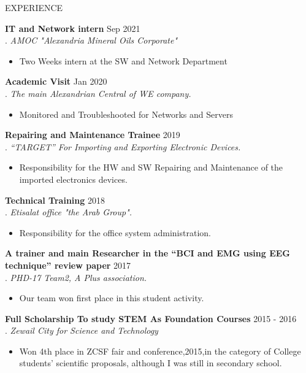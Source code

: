 \documentclass{resume} %
\begin{document}
\begin{rSection}{EXPERIENCE}
 
  \textbf{IT and Network intern} \hfill   Sep 2021\\
 . \hfill \textit{AMOC "Alexandria Mineral Oils Corporate"}
  \begin{itemize}
     \itemsep -3pt {} 
      \item Two Weeks intern at the SW and Network Department
 \end{itemize}
 
   \textbf{Academic Visit} \hfill   Jan 2020\\
. \hfill \textit{The main Alexandrian Central of WE company.}
  \begin{itemize}
     \itemsep -3pt {} 
      \item  Monitored and Troubleshooted for Networks and Servers
 \end{itemize}
 
    \textbf{Repairing and Maintenance Trainee} \hfill    2019\\
. \hfill \textit{“TARGET” For Importing and Exporting Electronic Devices.}
  \begin{itemize}
     \itemsep -3pt {} 
      \item  Responsibility for the HW and SW Repairing and Maintenance of the imported electronics devices.
 \end{itemize}
 
     \textbf{Technical Training} \hfill   2018\\
. \hfill \textit{Etisalat office "the Arab Group".}
  \begin{itemize}
     \itemsep -3pt {} 
      \item  Responsibility for the office system administration.
 \end{itemize}

     \textbf{A trainer and main Researcher in the “BCI and EMG using EEG technique” review paper} \hfill   2017\\
. \hfill \textit{PHD-17 Team2, A Plus association.}
  \begin{itemize}
     \itemsep -3pt {} 
      \item  Our team won first place in this student activity.
 \end{itemize}
 
 \textbf{Full Scholarship To study STEM As Foundation Courses} \hfill  2015 -  2016\\
. \hfill \textit{Zewail City for Science and Technology}
  \begin{itemize}
     \itemsep -3pt {} 
      \item Won 4th place in ZCSF fair and conference,2015,in the category of College students’ scientific proposals, although I was still in secondary school.
\end{itemize}


\end{rSection}
\end{document}
